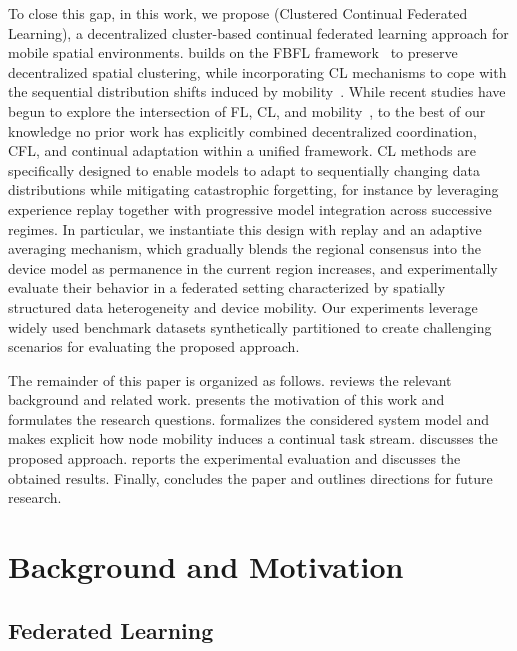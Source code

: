 \documentclass[conference]{IEEEtran}
\theoremstyle{plain}
\theoremstyle{definition}
\begin{document}
To close this gap, in this work, 
we propose \approach{} (Clustered Continual Federated Learning), a decentralized cluster-based continual federated learning approach
 for mobile spatial environments. \approach{} builds on the FBFL framework~\cite{DBLP:journals/lmcs/DominiAEV26}
 to preserve decentralized spatial clustering, while incorporating \ac{CL} mechanisms
 to cope with the sequential distribution shifts induced by mobility~\cite{DBLP:journals/nn/ParisiKPKW19}. 
While recent studies have begun to explore the intersection of \ac{FL},
 \ac{CL}, and mobility~\cite{DBLP:journals/corr/abs-2411-13740}, to the best of our knowledge no prior
 work has explicitly combined decentralized coordination, \ac{CFL},
 and continual adaptation within a unified framework. 
%
CL methods are specifically designed to enable models to adapt 
to sequentially changing data distributions while mitigating catastrophic forgetting, 
for instance by leveraging experience replay together with progressive model integration across successive regimes.
In particular, we instantiate this design with replay and an adaptive averaging mechanism,
which gradually blends the regional consensus into the device model as permanence in the current region increases, and
 experimentally evaluate their behavior in a federated setting characterized by spatially structured
 data heterogeneity and device mobility. Our experiments leverage widely used benchmark datasets
 synthetically partitioned to create challenging scenarios for evaluating the proposed approach.

The remainder of this paper is organized as follows. 
%
 reviews the relevant background and related work.
% 
 presents the motivation of this work and formulates the research questions. 
%
 formalizes the considered system model and makes explicit how node mobility induces a continual task stream. 
%
 discusses the proposed \approach{} approach.
%
 reports the experimental evaluation and discusses the obtained results. 
%
Finally, 
  concludes the paper and outlines directions for future research.

\section{Background and Motivation}\label{sec:related}



\subsection{Federated Learning}
\end{document}
